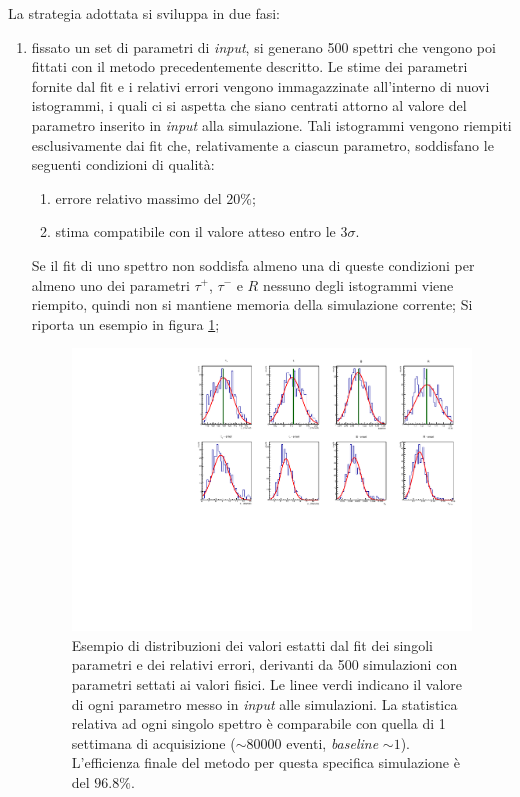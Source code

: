 \documentclass[10pt, oneside, a4paper]{article}   	%
\begin{document}
La strategia adottata si sviluppa in due fasi:
\begin{enumerate}
 \item fissato un set di parametri di \textit{input}, si generano 500 spettri che vengono poi fittati con il metodo precedentemente descritto. Le stime dei parametri fornite dal fit e i relativi errori vengono immagazzinate all'interno di nuovi istogrammi, i quali ci si aspetta che siano centrati attorno al valore del parametro inserito in \textit{input} alla simulazione. Tali istogrammi vengono riempiti esclusivamente dai fit che, relativamente a ciascun parametro, soddisfano le seguenti condizioni di qualità:
 \begin{enumerate}
  \item errore relativo massimo del $20\%$;
  \item stima compatibile con il valore atteso entro le $3\sigma$. 
 \end{enumerate}
 Se il fit di uno spettro non soddisfa almeno una di queste condizioni per almeno uno dei parametri $\tau^+$, $\tau^-$ e $R$ nessuno degli istogrammi viene riempito, quindi non si mantiene memoria della simulazione corrente;
 Si riporta un esempio in figura \ref{fig::esempio_set_simulazioni};
 \begin{figure}
  \centering
  \includegraphics[scale=0.75]{img/Single_Nsim_distr}
  \caption{Esempio di distribuzioni dei valori estatti dal fit dei singoli parametri e dei relativi errori, derivanti da 500 simulazioni con parametri settati ai valori fisici. Le linee verdi indicano il valore di ogni parametro messo in \textit{input} alle simulazioni. La statistica relativa ad ogni singolo spettro è comparabile con quella di 1 settimana di acquisizione ($\sim 80000$ eventi, \textit{baseline} $\sim 1$). L'efficienza finale del metodo per questa specifica simulazione è del $96.8\%$.}
  \label{fig::esempio_set_simulazioni}
 \end{figure}
 

\end{enumerate}
\end{document}
